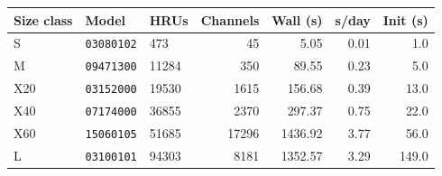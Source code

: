 \begin{tabular*}{\textwidth}{@{\extracolsep{\fill}}lllrrrr@{}}
\toprule
Size class & Model & HRUs & Channels & Wall (s) & s/day & Init (s) \\
\midrule
S & \texttt{03080102} & 473 & 45 & 5.05 & 0.01 & 1.0 \\
M & \texttt{09471300} & 11284 & 350 & 89.55 & 0.23 & 5.0 \\
X20 & \texttt{03152000} & 19530 & 1615 & 156.68 & 0.39 & 13.0 \\
X40 & \texttt{07174000} & 36855 & 2370 & 297.37 & 0.75 & 22.0 \\
X60 & \texttt{15060105} & 51685 & 17296 & 1436.92 & 3.77 & 56.0 \\
L & \texttt{03100101} & 94303 & 8181 & 1352.57 & 3.29 & 149.0 \\
\bottomrule
\end{tabular*}
